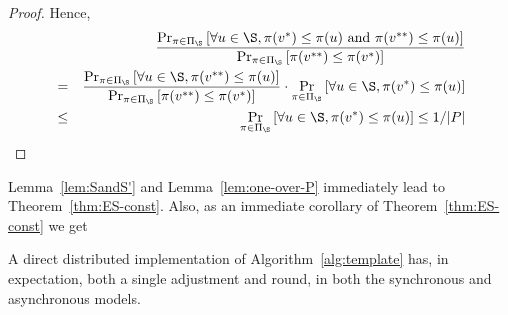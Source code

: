 \begin{proof}
Hence,
\begin{eqnarray*} 
 &  & \frac{\Pr_{\pi\in\Pi_{\S}}\left[\forall u\in\S,\pi(v^{*})\leq\pi(u)\mbox{ and }\pi(v^{**})\leq\pi(u)\right]}{\Pr_{\pi\in\Pi_{\S}}\left[\pi(v^{**})\leq\pi(v^{*})\right]} \\
  & = & \frac{\Pr_{\pi\in\Pi_{\S}}\left[\forall u\in\S,\pi(v^{**})\leq\pi(u)\right]}{\Pr_{\pi\in\Pi_{\S}}\left[\pi(v^{**})\leq\pi(v^{*})\right]} \cdot \Pr_{\pi\in\Pi_{\S}}\left[\forall u\in\S,\pi(v^{*})\leq\pi(u)\right] \\
 & \leq & \Pr_{\pi\in\Pi_{\S}}\left[\forall u\in\S,\pi(v^{*})\leq\pi(u)\right]  \leq 1/|P|
\end{eqnarray*}
\vspace{-0.2in}

\end{proof}
\vspace{-0.1in}

Lemma~\ref{lem:SandS'} and Lemma~\ref{lem:one-over-P} immediately lead to Theorem~\ref{thm:ES-const}. Also, as an immediate corollary of Theorem~\ref{thm:ES-const} we get

\begin{corollary}
A direct distributed implementation of Algorithm~\ref{alg:template} has, in expectation, both a single adjustment and round, in both the synchronous and asynchronous models.
\end{corollary}
